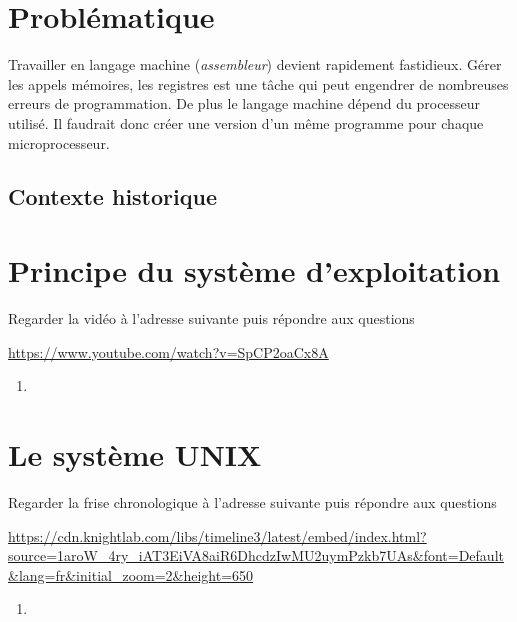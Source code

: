 \documentclass[a4paper,11pt]{article}
\begin{document}
\begin{Form}
\section{Problématique}
Travailler en langage machine (\emph{assembleur}) devient rapidement fastidieux. Gérer les appels mémoires, les registres est une tâche qui peut engendrer de nombreuses erreurs de programmation. De plus le langage machine dépend du processeur utilisé. Il faudrait donc créer une version d'un même programme pour chaque microprocesseur.
\begin{center}
\end{center}
\begin{commentprof}
\section*{Contexte historique}

\end{commentprof}
\section{Principe du système d'exploitation}
\begin{activite}
Regarder la vidéo à l'adresse suivante puis répondre aux questions
\begin{center}
\url{https://www.youtube.com/watch?v=SpCP2oaCx8A}
\end{center}
\begin{enumerate}
\item
\end{enumerate}
\end{activite}
\section{Le système UNIX}
\begin{activite}
Regarder la frise chronologique à l'adresse suivante puis répondre aux questions
\begin{center}
\url{https://cdn.knightlab.com/libs/timeline3/latest/embed/index.html?source=1aroW_4ry_iAT3EiVA8aiR6DhcdzIwMU2uymPzkb7UAs&font=Default&lang=fr&initial_zoom=2&height=650}
\end{center}
\begin{enumerate}
\item
\end{enumerate}
\end{activite}
\end{Form}
\end{document}
